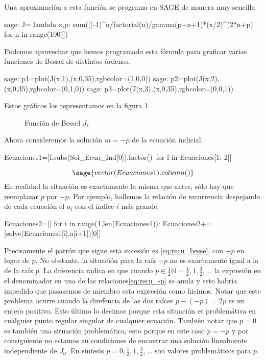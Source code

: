 \documentclass{article}
\newcounter{lem_cont}
\newcounter{ejem_cont}
\begin{document}
Una aproximación a esta función se programa en SAGE de manera muy sencilla
\begin{sagecommandline}
sage: J= lambda x,p: sum([(-1)^n/factorial(n)/gamma(p+n+1)*(x/2)^(2*n+p) for n in range(100)])
\end{sagecommandline}
Podemos aprovechar que hemos programado esta fórmula para graficar varias funciones de Bessel de distintos órdenes.
\begin{sagecommandline}
sage: p1=plot(J(x,1),(x,0,35),rgbcolor=(1,0,0))
sage: p2=plot(J(x,2),(x,0,35),rgbcolor=(0,1,0))
sage: p3=plot(J(x,3),(x,0,35),rgbcolor=(0,0,1))
\end{sagecommandline}
Estos gráficos los representamos en la figura \ref{fig:bessel}.
\begin{center}
\begin{figure}[h]
\caption{Función de Bessel $J_1$}\label{fig:bessel}
\end{figure}
\end{center}




Ahora consideremos la solución $m=-p$ de la ecuación indicial.
\begin{sageblock}
Ecuaciones1=[f.subs(Sol_Ecua_Ind[0]).factor()\
for f in Ecuaciones[1:-2]]
\end{sageblock}
 \[\sage{vector(Ecuaciones1).column()}\]
En realidad la situación es exactamente la misma que antes, sólo hay que reemplazar $p$ por $-p$. Por ejemplo, hallemos la relación de recurrencia despejando de cada ecuación el $a_i$ con el índice $i$ más grande. 
\begin{sageblock}
Ecuaciones2=[]
for i in range(1,len(Ecuaciones1)):
    Ecuaciones2+=[solve(Ecuaciones1[i],a[i+1])[0]]
 \end{sageblock}
Precisamente el patrón que sigue esta sucesión es \eqref{eq:recu_bessel} con $-p$ en lugar de $p$. No obstante, la situación para la raíz $-p$ no es exactamente igual a la de la raíz $p$. La diferencia radica en que cuando $p\in\frac12\mathbb{N}=\frac12,1,\frac32,\ldots$  la expresión en el denominador en una de las relaciones\eqref{eq:recu_-p} se anula y esto  habría impedido que pasasemos de miembro esta expresión como hicimos. Notar que este problema ocurre cuando la direfencia de las dos raíces $p-(-p)=2p$ es un entero positivo.  Esto último lo decimos porque esta situación es problemática en cualguier punto regular singular de cualquier ecuación. También notar que $p=0$ es también una situación problemática, esto porque en este caso $p=-p$ y por consiguiente no estamos en condiciones de encontrar una solución linealmente independiente de $J_0$. En síntesis $p=0,\frac12,1,\frac32,\ldots$ son valores problemáticos para $p$. 
\end{document}
